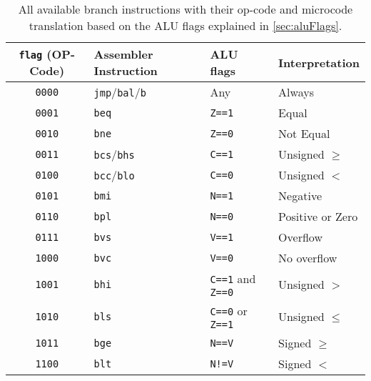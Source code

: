 \begin{table}
  \centering
  \renewcommand{\arraystretch}{1.25}
  \caption{All available branch instructions with their op-code and microcode translation based on the \gls{ALU} flags explained in \cref{sec:aluFlags}.}
  \label{tab:mc_flagMeanings}
  \begin{tabularx}{\textwidth}{ |c|l|l|X| }
    \hline
    \texttt{flag} (OP-Code) & Assembler Instruction                & \gls{ALU} flags                 & Interpretation   \\\hline\hline
    \texttt{0000}           & \texttt{jmp}/\texttt{bal}/\texttt{b} & Any                             & Always           \\\hline
    \texttt{0001}           & \texttt{beq}                         & \texttt{Z==1}                   & Equal            \\\hline
    \texttt{0010}           & \texttt{bne}                         & \texttt{Z==0}                   & Not Equal        \\\hline
    \texttt{0011}           & \texttt{bcs}/\texttt{bhs}            & \texttt{C==1}                   & Unsigned $\geq$  \\\hline
    \texttt{0100}           & \texttt{bcc}/\texttt{blo}            & \texttt{C==0}                   & Unsigned $<$     \\\hline
    \texttt{0101}           & \texttt{bmi}                         & \texttt{N==1}                   & Negative         \\\hline
    \texttt{0110}           & \texttt{bpl}                         & \texttt{N==0}                   & Positive or Zero \\\hline
    \texttt{0111}           & \texttt{bvs}                         & \texttt{V==1}                   & Overflow         \\\hline
    \texttt{1000}           & \texttt{bvc}                         & \texttt{V==0}                   & No overflow      \\\hline
    \texttt{1001}           & \texttt{bhi}                         & \texttt{C==1} and \texttt{Z==0} & Unsigned $>$     \\\hline
    \texttt{1010}           & \texttt{bls}                         & \texttt{C==0} or \texttt{Z==1}  & Unsigned $\leq$  \\\hline
    \texttt{1011}           & \texttt{bge}                         & \texttt{N==V}                   & Signed $\geq$    \\\hline
    \texttt{1100}           & \texttt{blt}                         & \texttt{N!=V}                   & Signed $<$       \\\hline

\end{tabularx}
\end{table}
